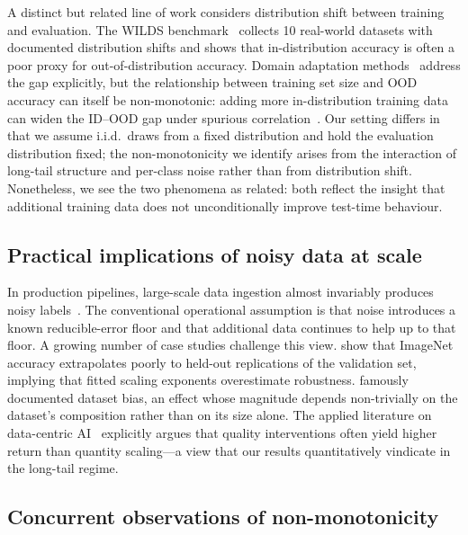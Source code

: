 \documentclass[11pt]{article}
\begin{document}
A distinct but related line of work considers distribution shift between training and evaluation. The WILDS benchmark~\cite{koh2021} collects 10 real-world datasets with documented distribution shifts and shows that in-distribution accuracy is often a poor proxy for out-of-distribution accuracy. Domain adaptation methods~\cite{ganin2016, long2015} address the gap explicitly, but the relationship between training set size and OOD accuracy can itself be non-monotonic: adding more in-distribution training data can widen the ID--OOD gap under spurious correlation~\cite{sagawa2020, arjovsky2019irm}. Our setting differs in that we assume i.i.d.\ draws from a fixed distribution and hold the evaluation distribution fixed; the non-monotonicity we identify arises from the interaction of long-tail structure and per-class noise rather than from distribution shift. Nonetheless, we see the two phenomena as related: both reflect the insight that additional training data does not unconditionally improve test-time behaviour.

\subsection{Practical implications of noisy data at scale}

In production pipelines, large-scale data ingestion almost invariably produces noisy labels~\cite{jain2020, paleyes2022}. The conventional operational assumption is that noise introduces a known reducible-error floor and that additional data continues to help up to that floor. A growing number of case studies challenge this view. \citet{recht2019} show that ImageNet accuracy extrapolates poorly to held-out replications of the validation set, implying that fitted scaling exponents overestimate robustness. \citet{torralba2011} famously documented dataset bias, an effect whose magnitude depends non-trivially on the dataset's composition rather than on its size alone. The applied literature on data-centric AI~\cite{ng2021datacentric} explicitly argues that quality interventions often yield higher return than quantity scaling---a view that our results quantitatively vindicate in the long-tail regime.

\subsection{Concurrent observations of non-monotonicity}
\end{document}
